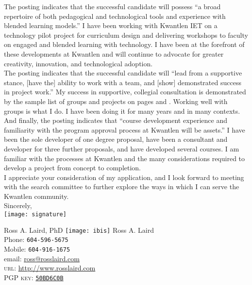 \documentclass[10pt, a4paper]{article}
\begin{document}
The posting indicates that the successful candidate will possess ``a broad repertoire of both pedagogical and technological tools and experience with blended learning models.'' I have been working with Kwantlen IET on a technology pilot project for curriculum design and delivering workshops to faculty on engaged and blended learning with technology. I have been at the forefront of these developments at Kwantlen and will continue to advocate for greater creativity, innovation, and technological adoption.\\
\newpage
The posting indicates that the successful candidate will ``lead from a supportive stance, [have the] ability to work with a team, and [show] demonstrated success in project work.'' My success in supportive, collegial consultation is demonstrated by the sample list of groups and projects on pages \pageref{sample_consulting} and \pageref{sample_supervision}. Working well with groups is what I do. I have been doing it for many years and in many contexts.\\

And finally, the posting indicates that ``course development experience and familiarity with the program approval process at Kwantlen will be assets.'' I have been the sole developer of one degree proposal, have been a consultant and developer for three further proposals, and have developed several courses. I am familiar with the processes at Kwantlen and the many considerations required to develop a project from concept to completion.\\

I appreciate your consideration of my application, and I look forward to meeting with the search committee to further explore the ways in which I can serve the Kwantlen community.\\

Sincerely,\\

\texttt{[image: signature]}

Ross A. Laird, PhD
\newpage
\reversemarginpar
\texttt{[image: ibis]}
{\LARGE Ross A. Laird}\\[1em]
Phone: \texttt{604-596-5675}\\
Mobile: \texttt{604-916-1675}\\[.2cm]
email: \href{mailto:ross@rosslaird.com}{ross@rosslaird.com}\\
\textsc{url}: \href{http://www.rosslaird.com}{http://www.rosslaird.com}\\
\textsc{PGP key}: \href{http://keyserver.ubuntu.com:11371/pks/lookup?op=get&search=0x623D9CC650BD6C0B}{\texttt{50BD6C0B}}
\end{document}
